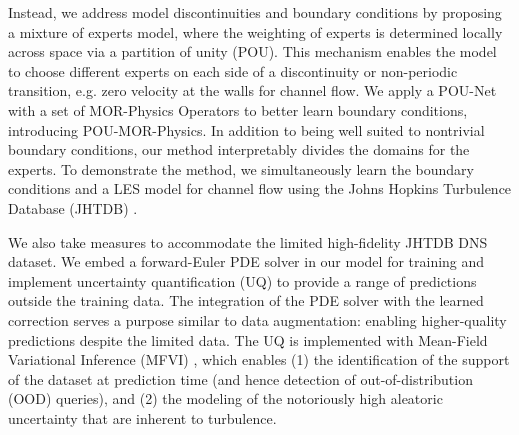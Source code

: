 
Instead, we address model discontinuities and boundary conditions by proposing a mixture of experts model, where the weighting of experts is determined locally across space via a partition of unity (POU). This mechanism enables the model to choose different experts on each side of a discontinuity or non-periodic transition, e.g. zero velocity at the walls for channel flow.  We apply a POU-Net \cite{lee2021POU_net, shazeer2017MoE_Sparse}  with a set of MOR-Physics Operators \cite{patel2018MOR_Operator} to better learn boundary conditions, introducing POU-MOR-Physics. In addition to being well suited to nontrivial boundary conditions, our method interpretably divides the domains for the experts. To demonstrate the method, we simultaneously learn the boundary conditions and a LES model for channel flow using the Johns Hopkins Turbulence Database (JHTDB) \cite{li2008JHTDB,graham2016JHTDB_channel,perlman2007JHTDB}.


We also take measures to accommodate the limited high-fidelity JHTDB DNS dataset. We embed a forward-Euler PDE solver in our model for training and implement uncertainty quantification (UQ) to provide a range of predictions outside the training data. The integration of the PDE solver with the learned correction serves a purpose similar to data augmentation: enabling higher-quality predictions despite the limited data. The UQ is implemented with Mean-Field Variational Inference (MFVI) \cite{blei2017variational}, which enables (1) the identification of the support of the dataset at prediction time (and hence detection of out-of-distribution (OOD) queries), and (2) the modeling of the notoriously high aleatoric uncertainty that are inherent to turbulence.


